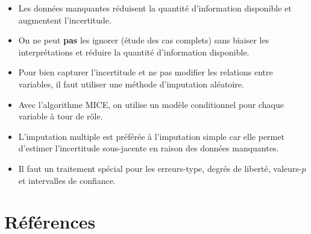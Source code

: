\documentclass[
  11pt,
  letterpaper,
]{scrbook}
\providecommand{\tightlist}{%
  \setlength{\itemsep}{0pt}\setlength{\parskip}{0pt}}\usepackage{longtable,booktabs,array}
\theoremstyle{definition}
\theoremstyle{remark}
\begin{document}
\begin{tcolorbox}[enhanced jigsaw, coltitle=black, left=2mm, opacitybacktitle=0.6, colback=white, leftrule=.75mm, colframe=quarto-callout-note-color-frame, toprule=.15mm, colbacktitle=quarto-callout-note-color!10!white, opacityback=0, bottomtitle=1mm, toptitle=1mm, rightrule=.15mm, title=\textcolor{quarto-callout-note-color}{\faInfo}\hspace{0.5em}{En résumé}, breakable, titlerule=0mm, arc=.35mm, bottomrule=.15mm]

\begin{itemize}
\tightlist
\item
  Les données manquantes réduisent la quantité d'information disponible
  et augmentent l'incertitude.
\item
  On ne peut \textbf{pas} les ignorer (étude des cas complets) sans
  biaiser les interprétations et réduire la quantité d'information
  disponible.
\item
  Pour bien capturer l'incertitude et ne pas modifier les relations
  entre variables, il faut utiliser une méthode d'imputation aléatoire.
\item
  Avec l'algorithme MICE, on utilise un modèle conditionnel pour chaque
  variable à tour de rôle.
\item
  L'imputation multiple est préférée à l'imputation simple car elle
  permet d'estimer l'incertitude sous-jacente en raison des données
  manquantes.
\item
  Il faut un traitement spécial pour les erreurs-type, degrés de
  liberté, valeurs-\(p\) et intervalles de confiance.
\end{itemize}

\end{tcolorbox}


\chapter*{Références}\label{ruxe9fuxe9rences}

\end{document}
